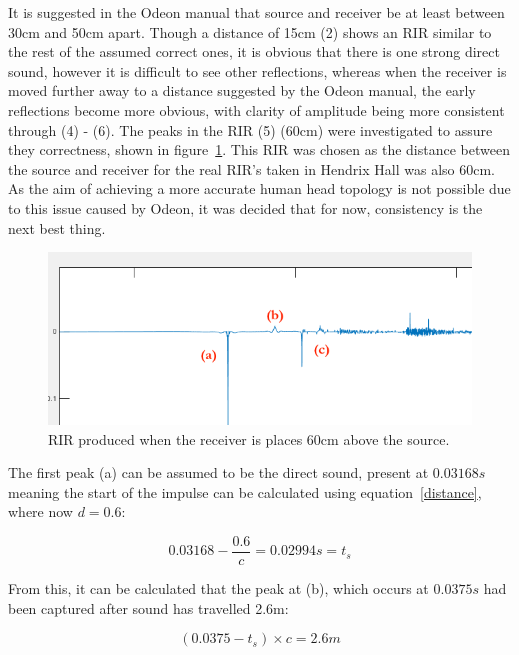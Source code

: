 \documentclass[../../main.tex]{subfiles}
\begin{document}
			It is suggested in the Odeon manual that source and receiver be at least between 30cm and 50cm apart. Though a distance of 15cm (2) shows an \ac{RIR} similar to the rest of the assumed correct ones, it is obvious that there is one strong direct sound, however it is difficult to see other reflections, whereas when the receiver is moved further away to a distance suggested by the Odeon manual, the early reflections become more obvious, with clarity of amplitude being more consistent through (4) - (6). The peaks in the RIR (5) (60cm) were investigated to assure they correctness, shown in figure~\ref{60cm}. This \ac{RIR} was chosen as the distance between the source and receiver for the real RIR’s taken in Hendrix Hall was also 60cm. As the aim of achieving a more accurate human head topology is not possible due to this issue caused by Odeon, it was decided that for now, consistency is the next best thing.

			\begin{figure}[H]
				\centerline{\includegraphics[scale = 0.6]{Sections/Implementation/Odeon/images/incorrectRIR/76_60cm_editV2_crop.png}}
				\caption{\ac{RIR} produced when the receiver is places 60cm above the source.}
				\label{60cm}
			\end{figure}

			The first peak (a) can be assumed to be the direct sound, present at $0.03168s$ meaning the start of the impulse can be calculated using equation~\ref{distance}, where now $d = 0.6$:

			\begin{equation}
			0.03168 - \frac{0.6}{c} = 0.02994s = t_s
			\end{equation}

			From this, it can be calculated that the peak at (b), which occurs at $0.0375s$ had been captured after sound has travelled 2.6m:

			\begin{equation}
			(0.0375 - t_s)\times{c} = 2.6m
			\end{equation}
\end{document}
